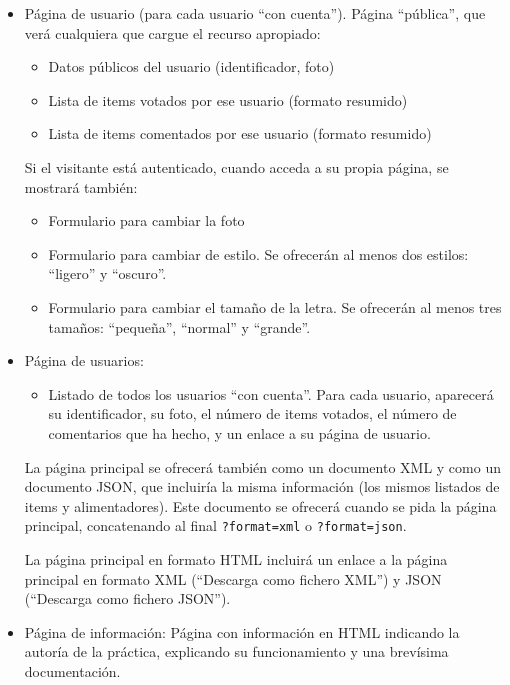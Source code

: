 \begin{itemize}
  \item Página de usuario (para cada usuario ``con cuenta''). Página ``pública'', que verá cualquiera que cargue el recurso apropiado:

    \begin{itemize}
    \item Datos públicos del usuario (identificador, foto)
    \item Lista de items votados por ese usuario (formato resumido)
    \item Lista de items comentados por ese usuario (formato resumido)
    \end{itemize}

    Si el visitante está autenticado, cuando acceda a su propia página, se mostrará también:

    \begin{itemize}
    \item Formulario para cambiar la foto
    \item Formulario para cambiar de estilo. Se ofrecerán al menos dos estilos: ``ligero'' y ``oscuro''.
    \item Formulario para cambiar el tamaño de la letra. Se ofrecerán al menos tres tamaños: ``pequeña'', ``normal'' y ``grande''.
    \end{itemize}
    
  \item Página de usuarios:

    \begin{itemize}
    \item Listado de todos los usuarios ``con cuenta''. Para cada usuario, aparecerá su identificador, su foto, el número de items votados, el número de comentarios que ha hecho, y un enlace a su página de usuario.
    \end{itemize}

  La página principal se ofrecerá también como un documento XML y como un documento JSON, que incluiría la misma información (los mismos listados de items y alimentadores). Este documento se ofrecerá cuando se pida la página principal, concatenando al final \verb|?format=xml| o \verb|?format=json|.

  La página principal en formato HTML incluirá un enlace a la página principal en formato XML (``Descarga como fichero XML'') y JSON (``Descarga como fichero JSON'').  
 
  \item Página de información: Página con información en HTML indicando la autoría de la práctica, explicando su funcionamiento y una brevísima documentación.

\end{itemize}

